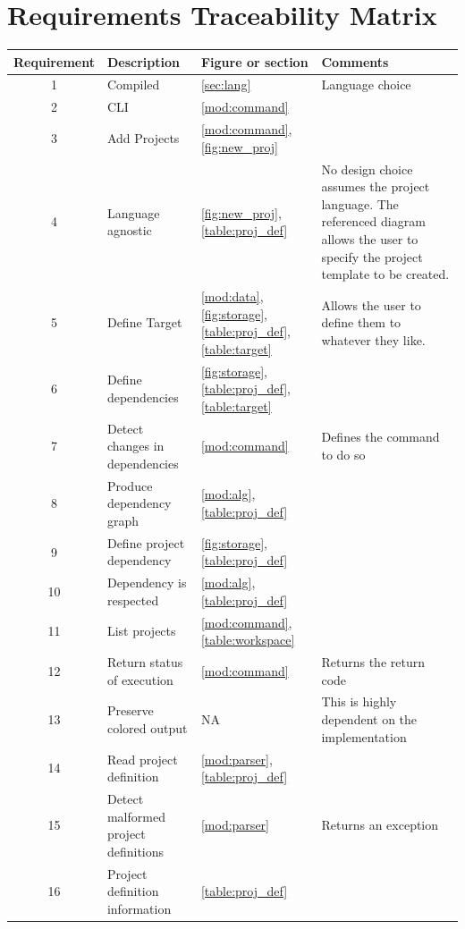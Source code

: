 \documentclass[11pt]{article}
\begin{document}
\section{Requirements Traceability Matrix}

\begin{tabular}[h!]{c|p{5cm}|p{2cm}| p{4cm}}
  \textbf{Requirement} & \textbf{Description} & \textbf{Figure or section} & \textbf{Comments} \\
  \hline
  1 & Compiled & \ref{sec:lang} & Language choice \\
  \hline
  2 & \Gls{CLI} & \ref{mod:command} & \\
  \hline
  3 & Add Projects & \ref{mod:command}, \ref{fig:new_proj} & \\
  \hline
  4 & Language agnostic & \ref{fig:new_proj}, \ref{table:proj_def} & No design choice assumes the project language. The referenced diagram allows the user to specify the project template to be created.\\
  \hline
  5 & Define Target & \ref{mod:data}, \ref{fig:storage}, \ref{table:proj_def}, \ref{table:target} & Allows the user to define them to whatever they like. \\
  \hline
  6 & Define dependencies & \ref{fig:storage}, \ref{table:proj_def},
                            \ref{table:target} & \\
  \hline
  7 & Detect changes in dependencies & \ref{mod:command} & Defines the command to do so \\
  \hline
  8 & Produce dependency graph & \ref{mod:alg}, \ref{table:proj_def} & \\
  \hline
  9 & Define project dependency & \ref{fig:storage}, \ref{table:proj_def} & \\
  \hline
  10 & Dependency is respected & \ref{mod:alg}, \ref{table:proj_def} & \\
  \hline
  11 & List projects & \ref{mod:command}, \ref{table:workspace}& \\
  \hline
  12 & Return status of execution  & \ref{mod:command} & Returns the return code \\
  \hline
  13 & Preserve colored output & NA & This is highly dependent on the implementation \\
  \hline
  14 & Read project definition & \ref{mod:parser}, \ref{table:proj_def} & \\
  \hline
  15 & Detect malformed project definitions & \ref{mod:parser} & Returns an exception \\
  \hline
  16 & Project definition information & \ref{table:proj_def} & \\

\end{tabular}
\end{document}
